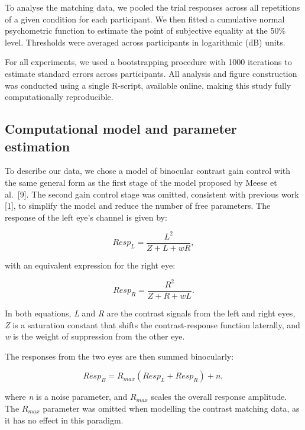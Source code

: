 \documentclass[
]{article}
\begin{document}
To analyse the matching data, we pooled the trial responses across all repetitions of a given condition for each participant. We then fitted a cumulative normal psychometric function to estimate the point of subjective equality at the 50\% level. Thresholds were averaged across participants in logarithmic (dB) units.

For all experiments, we used a bootstrapping procedure with 1000 iterations to estimate standard errors across participants. All analysis and figure construction was conducted using a single R-script, available online, making this study fully computationally reproducible.

\hypertarget{computational-model-and-parameter-estimation}{%
\subsection{Computational model and parameter estimation}\label{computational-model-and-parameter-estimation}}

To describe our data, we chose a model of binocular contrast gain control with the same general form as the first stage of the model proposed by Meese et al.~{[}9{]}. The second gain control stage was omitted, consistent with previous work {[}1{]}, to simplify the model and reduce the number of free parameters. The response of the left eye's channel is given by:

\begin{equation}
\label{eq:respL}
Resp_L = \frac{L^2}{Z + L + wR},
\end{equation}

with an equivalent expression for the right eye:

\begin{equation}
\label{eq:respR}
Resp_R = \frac{R^2}{Z + R + wL}.
\end{equation}

In both equations, \emph{L} and \emph{R} are the contrast signals from the left and right eyes, \emph{Z} is a saturation constant that shifts the contrast-response function laterally, and \emph{w} is the weight of suppression from the other eye.

The responses from the two eyes are then summed binocularly:

\begin{equation}
\label{eq:respB}
Resp_B = R_{max}(Resp_L + Resp_R) + n,
\end{equation}

where \emph{n} is a noise parameter, and \(R_{max}\) scales the overall response amplitude. The \(R_{max}\) parameter was omitted when modelling the contrast matching data, as it has no effect in this paradigm.
\end{document}
